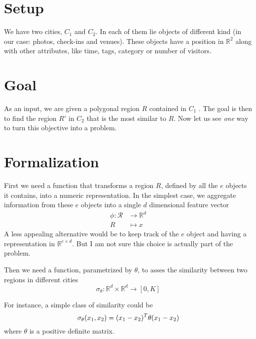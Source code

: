\documentclass[a4paper,11pt,draft]{scrartcl}
\begin{document}
\section*{Setup}
We have two cities, $C_1$ and $C_2$. In each of them lie objects of different
kind (in our case: photos, check-ins and venues). These objects have a
position in $\mathbb{R}^2$ along with other attributes, like time, tags,
category or number of visitors.

\section*{Goal}
As an input, we are given a polygonal region $R$ contained in $C_1$
. The goal is then to find the region $R'$ in $C_2$ that
is the most similar to $R$.
Now let us see \emph{one} way to turn this objective into a problem.

\section*{Formalization}
First we need a function that transforms a region $R$, defined by all the $e$
objects it contains, into a numeric representation. In the simplest case, we
aggregate information from these $e$ objects into a single $d$ dimensional
feature vector
\begin{align*}
	\phi \colon \mathcal{R} &\to \mathbb{R}^d \\
	R &\mapsto x
\end{align*}
A less appealing alternative would be to keep track of the $e$ object and having
a representation in $\mathbb{R}^{e\times d}$. But I am not sure this choice is
actually part of the problem.

Then we need a function, parametrized by $\theta$, to asses the similarity
between two regions in different cities
\[
	\sigma_{\theta} \colon \mathbb{R}^d \times \mathbb{R}^d \to [0, K]
\]

For instance, a simple class of similarity could be
\vspace{-0.3\baselineskip}\[
    \sigma_{\theta} (x_1, x_2) = (x_1 - x_2)^T \theta (x_1 - x_2)
\vspace{-0.3\baselineskip} \]
where $\theta$ is a positive definite matrix.

\medskip
\end{document}
